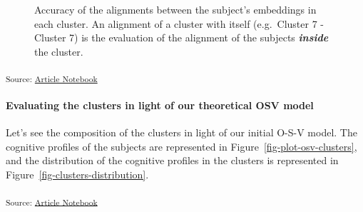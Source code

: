 \documentclass[
  authoryear]{elsarticle}
\let\oldparagraph\paragraph
\renewcommand{\paragraph}[1]{\oldparagraph{#1}\mbox{}}
\begin{document}
\label{cell-fig-clusters-accuracy}
\begin{figure}[H]


\caption{\label{fig-clusters-accuracy}Accuracy of the alignments between
the subject's embeddings in each cluster. An alignment of a cluster with
itself (e.g.~Cluster 7 - Cluster 7) is the evaluation of the alignment
of the subjects \textbf{\emph{inside}} the cluster.}

\end{figure}%

\textsubscript{Source:
\href{https://m-delem.github.io/2499-similarity-manuscript/index.qmd.html}{Article
Notebook}}

\paragraph{Evaluating the clusters in light of our theoretical OSV
model}\label{evaluating-the-clusters-in-light-of-our-theoretical-osv-model}

Let's see the composition of the clusters in light of our initial O-S-V
model. The cognitive profiles of the subjects are represented in
Figure~\ref{fig-plot-osv-clusters}, and the distribution of the
cognitive profiles in the clusters is represented in
Figure~\ref{fig-clusters-distribution}.

\textsubscript{Source:
\href{https://m-delem.github.io/2499-similarity-manuscript/index.qmd.html}{Article
Notebook}}
\end{document}
